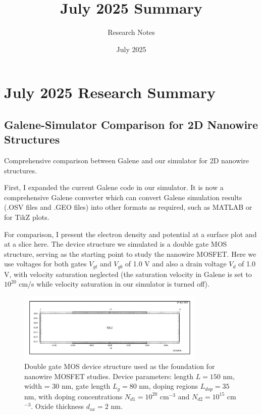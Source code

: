 \documentclass{article}
\title{July 2025 Summary}
\author{Research Notes}
\date{July 2025}
\begin{document}
\maketitle

\section{July 2025 Research Summary}

\subsection{Galene-Simulator Comparison for 2D Nanowire Structures}
Comprehensive comparison between Galene and our simulator for 2D nanowire structures.

First, I expanded the current Galene code in our simulator. It is now a comprehensive Galene converter which can convert Galene simulation results (.OSV files and .GEO files) into other formats as required, such as MATLAB or for TikZ plots.

For comparison, I present the electron density and potential at a surface plot and at a slice here. The device structure we simulated is a double gate MOS structure, serving as the starting point to study the nanowire MOSFET. Here we use voltages for both gates $V_{gt}$ and $V_{gb}$ of 1.0 V and also a drain voltage $V_d$ of 1.0 V, with velocity saturation neglected (the saturation velocity in Galene is set to $10^{20}$ cm/s while velocity saturation in our simulator is turned off).

\begin{figure}[htbp]
    \centering
    \includegraphics[width=0.8\textwidth]{Figs/dgmos.png}
    \caption{Double gate MOS device structure used as the foundation for nanowire MOSFET studies. Device parameters: length $L = 150$ nm, width = 30 nm, gate length $L_g = 80$ nm, doping regions $L_{dop} = 35$ nm, with doping concentrations $N_{d1} = 10^{20}$ cm$^{-3}$ and $N_{d2} = 10^{15}$ cm$^{-3}$. Oxide thickness $d_{ox} = 2$ nm.}
    \label{fig:dgmos}
\end{figure}
\end{document}
